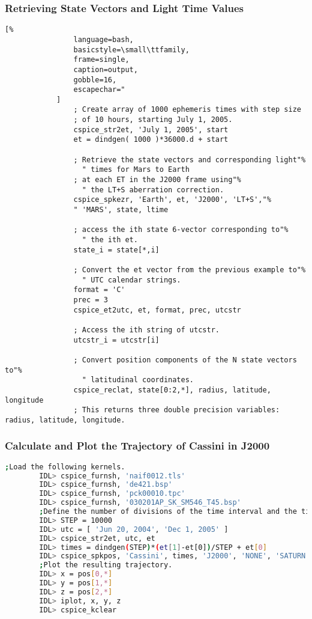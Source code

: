 \documentclass[crop=false,class=book]{standalone}
\begin{document}
        \subsubsection{Retrieving State Vectors and Light Time Values}
            \begin{lstlisting}[%
                language=bash,
                basicstyle=\small\ttfamily,
                frame=single,
                caption=output,
                gobble=16,
                escapechar="
            ]
                ; Create array of 1000 ephemeris times with step size
                ; of 10 hours, starting July 1, 2005.
                cspice_str2et, 'July 1, 2005', start
                et = dindgen( 1000 )*36000.d + start

                ; Retrieve the state vectors and corresponding light"%
                  " times for Mars to Earth
                ; at each ET in the J2000 frame using"%
                  " the LT+S aberration correction.
                cspice_spkezr, 'Earth', et, 'J2000', 'LT+S',"%
                " 'MARS', state, ltime
    
                ; access the ith state 6-vector corresponding to"%
                  " the ith et.
                state_i = state[*,i]

                ; Convert the et vector from the previous example to"%
                  " UTC calendar strings.
                format = 'C'
                prec = 3
                cspice_et2utc, et, format, prec, utcstr

                ; Access the ith string of utcstr.
                utcstr_i = utcstr[i]

                ; Convert position components of the N state vectors to"%
                  " latitudinal coordinates.
                cspice_reclat, state[0:2,*], radius, latitude, longitude
                ; This returns three double precision variables: radius, latitude, longitude.
            \end{lstlisting}
        \subsubsection{Calculate and Plot the Trajectory of Cassini in J2000}
        \begin{lstlisting}[language=bash,basicstyle=\footnotesize] 
        ;Load the following kernels.
        IDL> cspice_furnsh, 'naif0012.tls'
        IDL> cspice_furnsh, 'de421.bsp'
        IDL> cspice_furnsh, 'pck00010.tpc'
        IDL> cspice_furnsh, '030201AP_SK_SM546_T45.bsp' 
        ;Define the number of divisions of the time interval and the time interval.
        IDL> STEP = 10000
        IDL> utc = [ 'Jun 20, 2004', 'Dec 1, 2005' ]
        IDL> cspice_str2et, utc, et
        IDL> times = dindgen(STEP)*(et[1]-et[0])/STEP + et[0]
        IDL> cspice_spkpos, 'Cassini', times, 'J2000', 'NONE', 'SATURN BARYCENTER', pos, ltime
        ;Plot the resulting trajectory.
        IDL> x = pos[0,*]
        IDL> y = pos[1,*]
        IDL> z = pos[2,*]
        IDL> iplot, x, y, z
        IDL> cspice_kclear
        \end{lstlisting}
\end{document}
